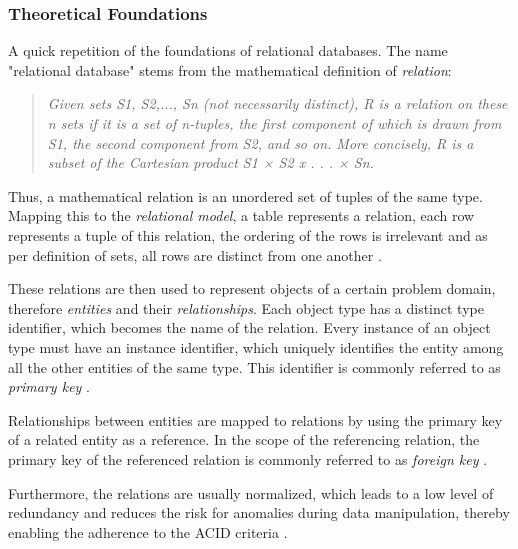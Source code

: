 \subsubsection{Theoretical Foundations} \label{sec:Theoretical Foundations Relational Database}
A quick repetition of the foundations of relational databases. The name "relational database" stems from the mathematical definition of \emph{relation}: 

\begin{quote}
	\textit{Given sets S1, S2,..., Sn (not necessarily distinct), R is a relation on these n sets if it is a set of n-tuples, the first component of which is drawn from S1, the second component from S2, and so on. More concisely, R is a subset of the Cartesian product S1 × S2 x . . . × Sn.}
	\cite{RelationalDatabaseModel}
\end{quote}

Thus, a mathematical relation is an unordered set of tuples of the same type. Mapping this to the \emph{relational model}, a table represents a relation, each row represents a tuple of this relation, the ordering of the rows is irrelevant and as per definition of sets, all rows are distinct from one another \cite{RelationalDatabaseModel}.\par
These relations are then used to represent objects of a certain problem domain, therefore \emph{entities} and their \emph{relationships}. Each object type has a distinct type identifier, which becomes the name of the relation. Every instance of an object type must have an instance identifier, which uniquely identifies the entity among all the other entities of the same type. This identifier is commonly referred to as \emph{primary key} \cite{RelationalDatabaseModel}.\par
Relationships between entities are mapped to relations by using the primary key of a related entity as a reference. In the scope of the referencing relation, the primary key of the referenced relation is commonly referred to as \emph{foreign key} \cite{RelationalDatabaseModel}.\par
Furthermore, the relations are usually normalized, which leads to a low level of redundancy and reduces the risk for anomalies during data manipulation, thereby enabling the adherence to the ACID criteria \cite{RelationalDatabaseModel}.\\

